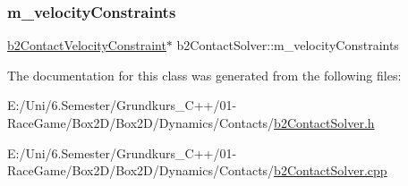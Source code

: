 \mbox{\label{classb2_contact_solver_a616319ffa7ceb509b8189f07a070f7c7}} 
\subsubsection{\texorpdfstring{m\_velocityConstraints}{m\_velocityConstraints}}
{\footnotesize\ttfamily \mbox{\hyperlink{structb2_contact_velocity_constraint}{b2\+Contact\+Velocity\+Constraint}}$\ast$ b2\+Contact\+Solver\+::m\+\_\+velocity\+Constraints}



The documentation for this class was generated from the following files\+:\begin{DoxyCompactItemize}
\item 
E\+:/\+Uni/6.\+Semester/\+Grundkurs\+\_\+\+C++/01-\/\+Race\+Game/\+Box2\+D/\+Box2\+D/\+Dynamics/\+Contacts/\mbox{\hyperlink{b2_contact_solver_8h}{b2\+Contact\+Solver.\+h}}\item 
E\+:/\+Uni/6.\+Semester/\+Grundkurs\+\_\+\+C++/01-\/\+Race\+Game/\+Box2\+D/\+Box2\+D/\+Dynamics/\+Contacts/\mbox{\hyperlink{b2_contact_solver_8cpp}{b2\+Contact\+Solver.\+cpp}}\end{DoxyCompactItemize}
